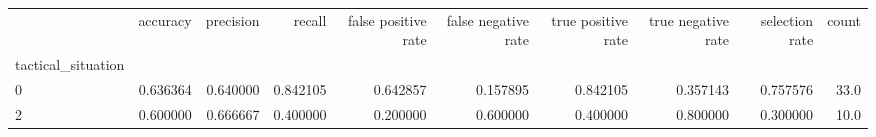 \begin{tabular}{lrrrrrrrrr}
\toprule
{} &  accuracy &  precision &    recall &  false positive rate &  false negative rate &  true positive rate &  true negative rate &  selection rate &  count \\
tactical\_situation &           &            &           &                      &                      &                     &                     &                 &        \\
\midrule
0                  &  0.636364 &   0.640000 &  0.842105 &             0.642857 &             0.157895 &            0.842105 &            0.357143 &        0.757576 &   33.0 \\
2                  &  0.600000 &   0.666667 &  0.400000 &             0.200000 &             0.600000 &            0.400000 &            0.800000 &        0.300000 &   10.0 \\
\bottomrule
\end{tabular}
